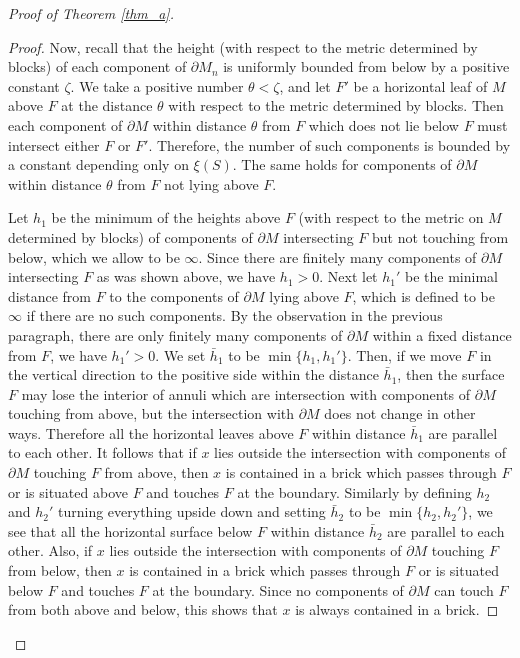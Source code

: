 \documentclass{amsart}
\theoremstyle{definition}
\numberwithin{figure}{section}
\numberwithin{equation}{section}
\begin{document}
\begin{proof}[Proof of Theorem \ref{thm_a}]
\begin{proof}
Now, recall that the height (with respect to the metric determined by blocks) of each component of $\partial M_n$ is uniformly bounded from below by a positive constant $\zeta$.
We take a positive number $\theta < \zeta$, and let $F'$ be a horizontal leaf of $M$ above $F$ at the distance $\theta$ with respect to the metric determined by blocks.
Then each component of $\partial M$ within distance $\theta$ from $F$ which does not lie below $F$ must intersect either $F$ or $F'$.
Therefore, the number of such components is bounded by a constant depending only on $\xi(S)$.
The same holds for components of $\partial M$ within distance $\theta$ from $F$ not lying above $F$.

Let $h_1$ be the minimum of the heights above $F$ (with respect to the metric on $M$ determined by blocks) of components of $\partial M$ intersecting $F$ but not touching from below, which we allow to be $\infty$.
Since there are finitely many components of $\partial M$ intersecting $F$ as was shown above, we have $h_1 >0$.
Next let $h_1'$ be the minimal distance from $F$ to the components of $\partial M$ lying above $F$, which is defined to be $\infty$ if there are no such components.
By the observation in the previous paragraph, there are only finitely many components of $\partial M$ within a fixed distance from $F$, we have $h_1' >0$.
We set $\bar h_1$ to be $\min \{h_1, h_1'\}$.
Then, if we move $F$ in the vertical direction to the positive side within the distance $\bar h_1$, then the surface $F$ may lose the interior of annuli which are intersection with components of $\partial M$ touching from above, but the intersection with $\partial M$ does not change in other ways.
Therefore all the horizontal leaves above $F$ within distance $\bar h_1$ are parallel to each other.
It follows that if $x$ lies outside the intersection with components of $\partial M$ touching $F$ from above, then $x$ is contained in a brick which passes through $F$ or is situated above $F$ and touches $F$ at the boundary.
Similarly by defining $h_2$ and $h_2'$ turning everything upside down and setting $\bar h_2$ to be $\min\{h_2, h_2'\}$, we see that all the horizontal surface below $F$ within distance $\bar h_2$ are parallel to each other.
Also, if $x$ lies outside the intersection with components of $\partial M$ touching $F$ from below, then $x$ is contained in a brick which passes through $F$ or is situated below $F$ and touches $F$ at the boundary.
Since no components of $\partial M$ can touch $F$ from both above and below, this shows that $x$ is always contained in a brick.


\end{proof}
\end{proof}
\end{document}
